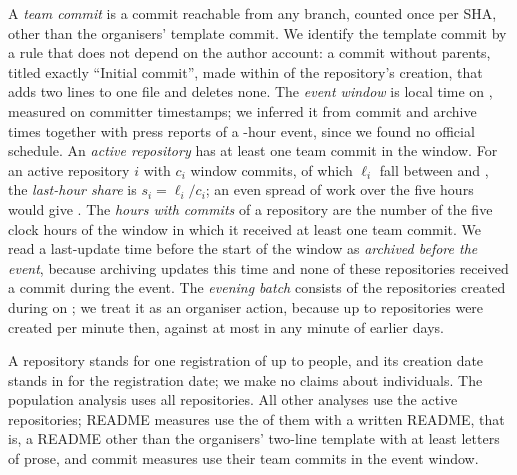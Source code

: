\documentclass{article}
\begin{document}
A \emph{team commit} is a commit reachable from any branch, counted once per SHA, other than the organisers' template commit. We identify the template commit by a rule that does not depend on the author account: a commit without parents, titled exactly ``Initial commit'', made within \templatesecs{} of the repository's creation, that adds two lines to one file and deletes none. The \emph{event window} is \eventwindow{} local time on \eventdate, measured on committer timestamps; we inferred it from commit and archive times together with press reports of a \eventhours-hour event, since we found no official schedule. An \emph{active repository} has at least one team commit in the window. For an active repository $i$ with $c_i$ window commits, of which $\ell_i$ fall between \lasthourstart{} and \deadline{}, the \emph{last-hour share} is $s_i = \ell_i / c_i$; an even spread of work over the five hours would give \evenshare. The \emph{hours with commits} of a repository are the number of the five clock hours of the window in which it received at least one team commit. We read a last-update time before the start of the window as \emph{archived before the event}, because archiving updates this time and none of these repositories received a commit during the event. The \emph{evening batch} consists of the repositories created during \batchwindow{} on \batchday{}; we treat it as an organiser action, because up to \NRqOneBatchMaxPerMinute{} repositories were created per minute then, against at most \NRqOneBatchOrganicMaxPerMinute{} in any minute of earlier days.

A repository stands for one registration of up to \teamsizemax{} people, and its creation date stands in for the registration date; we make no claims about individuals. The population analysis uses all \NRqOneTotal{} repositories. All other analyses use the \NRqOneActiveN{} active repositories; README measures use the \NRqThreeReadmeWritten{} of them with a written README, that is, a README other than the organisers' two-line template with at least \minletters{} letters of prose, and commit measures use their team commits in the event window.
\end{document}

